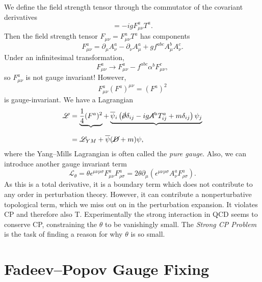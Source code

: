 We define the field strength tensor through the commutator of the covariant derivatives
\begin{equation}
  [D_{\mu}, D_{\nu}] = -i g F_{\mu\nu}^{a} T^{a}.
\end{equation}
Then the field strength tensor $F_{\mu\nu}= F_{\mu\nu}^{a} T^{a}$ has components
\begin{equation}
  \label{eq:nonabf}
  F_{\mu\nu}^{a} = \partial_{\mu} A_{\nu}^{a} - \partial_{\nu} A_{\mu}^{a} + g f^{abc} A^{b}_{\mu} A_{\nu}^{c}.
\end{equation}
Under an infinitesimal transformation,
\begin{equation}
  \label{eq:nonabftrans}
  F_{\mu\nu}^{a} \to F_{\mu\nu}^{a} - f^{abc} \alpha^{b} F^{c}_{\mu\nu},
\end{equation}
so $F_{\mu\nu}^{a}$ is not gauge invariant! However, 
\begin{equation}
  F_{\mu\nu}^{a} (F^{a})^{\mu\nu} = (F^{a})^2
\end{equation}
is gauge-invariant.
We have a Lagrangian
\begin{align}
  \mathscr{L} &= \underbrace{\frac{1}{4} (F^{a})^2}_{\mathclap{}} + \underbrace{\overline{\psi}{}_{i} \left( \cancel{\partial} \delta_{ij} - i g \cancel{A}^a T^{a}_{ij} + m \delta_{ij} \right) \psi_{j}}_{\mathclap{}} \\
	      &= \mathscr{L}_{YM} + \overline{\psi}{} (\cancel{D} + m) \psi,
\end{align}
where the Yang--Mills Lagrangian is often called the \emph{pure gauge}.
Also, we can introduce another gauge invariant term
\begin{equation}
  \mathscr{L}_{\theta} = \theta \epsilon^{\mu\nu\rho\sigma} F^{a}_{\mu\nu} F^{a}_{\rho\sigma} = 2 \theta \partial_{\mu} (\epsilon^{\mu\nu\rho\sigma} A^{a}_{\nu} F_{\rho\sigma}^{a}).
\end{equation}
As this is a total derivative, it is a boundary term which does not contribute to any order in perturbation theory. However, it can contribute a nonperturbative topological term, which we miss out on in the perturbation expansion. It violates CP and therefore also T. Experimentally the strong interaction in QCD seems to conserve CP, constraining the $\theta$ to be vanishingly small. The \emph{Strong CP Problem} is the task of finding a reason for why $\theta$ is so small.

\section{Fadeev--Popov Gauge Fixing}%
\label{sec:fadeev_popov_gauge_fixing}

